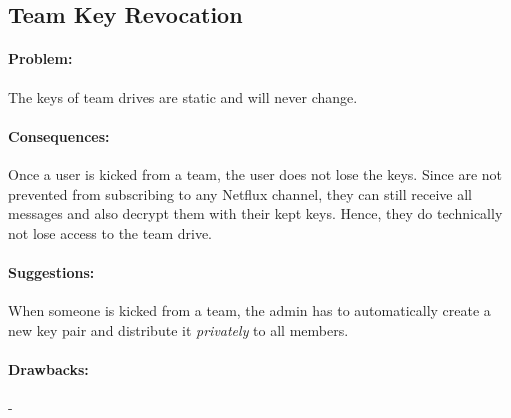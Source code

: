 \subsection{Team Key Revocation}

\paragraph{Problem:}
The keys of team drives are static and will never change.

\paragraph{Consequences:}
Once a user is kicked from a team, the user does not lose the keys.
Since are not prevented from subscribing to any Netflux channel, they can still receive all messages and also decrypt them with their kept keys.
Hence, they do technically not lose access to the team drive.

\paragraph{Suggestions:}
When someone is kicked from a team, the admin has to automatically create a new key pair and distribute it \textit{privately} to all members.

\paragraph{Drawbacks:} -
